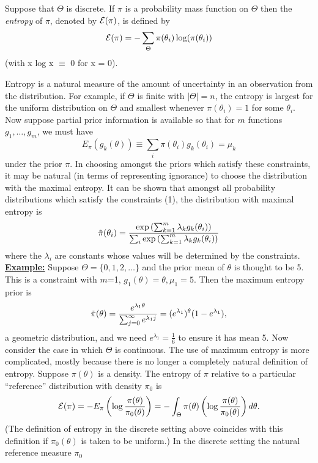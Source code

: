 \documentclass[12pt]{article}
\def\ni{\noindent}
\begin{document}
Suppose that $\Theta$ is discrete.  If $\pi$ is a probability mass
function on $\Theta$  then the
{\it entropy} of $\pi$, denoted by ${\cal{E}}(\pi)$, is defined by
$${\cal{E}} (\pi)= - \sum_{\Theta} \pi(\theta_i) \log(\pi(\theta_i))$$
(with x log x $\equiv$ 0 for x = 0).

Entropy is a natural
measure of the amount of uncertainty in an observation from the
distribution.  For example, if $\Theta$ is finite with $|\Theta |=n$,
the entropy is largest for the uniform distribution on $\Theta$ and
smallest whenever $\pi(\theta_i)=1$ for some $\theta_i$.
\vskip 4mm
Now suppose partial prior information is available so that for $m$
functions $g_1,\ldots,g_m$, we must have
\begin{equation}
E_{\pi} (g_k(\theta))\equiv \sum_{i} \pi(\theta_i) g_k(\theta_i)=\mu_k
\end{equation}
under the prior $\pi$.  In choosing amongst the priors which satisfy
these constraints, it may be natural (in terms of representing
ignorance) to choose the distribution with the maximal entropy.  It
can be shown that amongst all probability distributions which satisfy
the constraints (1), the distribution with maximal entropy is
$$\tilde{\pi} (\theta_i)={\exp \left( \sum_{k=1}^m \lambda_k
    g_k(\theta_i) \right) \over \sum_i \exp \left( \sum_{k=1}^m \lambda_k
    g_k(\theta_i) \right)}$$
where the $\lambda_i$ are constants whose values will be determined by
the constraints.
\vskip 4mm
\ni\underline{\bf Example:}  Suppose $\Theta=\{0,1,2,\ldots\}$ and the
prior mean of $\theta$ is thought to be 5.  This is a constraint with
$m$=1, $g_1(\theta)=\theta,\mu_1=5$.  Then the maximum entropy prior is
$$\tilde{\pi} (\theta)={e^{\lambda_1 \theta} \over \sum_{j=0}^\infty
  e^{\lambda_1 j}} = (e^{\lambda_1})^\theta (1-e^{\lambda_1}),$$
a geometric distribution, and we need $e^{\lambda_1}=\frac{1}{6}$ to
ensure it has mean 5.
\vskip 6mm
Now consider the case in which $\Theta$ is continuous.  The use of
maximum entropy is more complicated, mostly because there is no
longer a completely natural definition of entropy.
\vskip 4mm
Suppose $\pi(\theta)$ is a density.  The entropy of $\pi$ relative to
a particular ``reference'' distribution with density $\pi_0$ is
$${\cal{E}}(\pi)=-E_{\pi} \left( \log\frac{\pi(\theta)}{\pi_0 (\theta)}
\right) = -\int_\Theta \pi(\theta)\left( \log\frac{\pi(\theta)}{\pi_0
    (\theta)} \right) d\theta.$$
(The definition of entropy in the discrete setting above
coincides with this definition if $\pi_0 (\theta)$ is taken to be
uniform.)
\vskip 4mm
In the discrete setting the natural reference measure $\pi_0$
\end{document}
